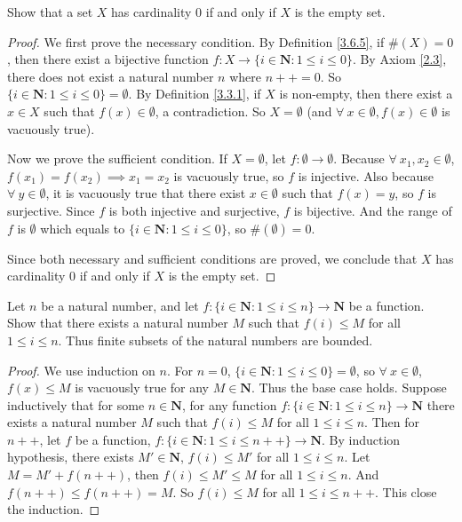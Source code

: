 \begin{exercise}\label{ex 3.6.2}
    Show that a set \(X\) has cardinality \(0\) if and only if \(X\) is the empty set.
\end{exercise}

\begin{proof}
    We first prove the necessary condition.
    By Definition \ref{3.6.5}, if \(\#(X) = 0\), then there exist a bijective function \(f : X \to \{i \in \mathbf{N} : 1 \leq i \leq 0\}\).
    By Axiom \ref{2.3}, there does not exist a natural number \(n\) where \(n++ = 0\).
    So \(\{i \in \mathbf{N} : 1 \leq i \leq 0\} = \emptyset\).
    By Definition \ref{3.3.1}, if \(X\) is non-empty, then there exist a \(x \in X\) such that \(f(x) \in \emptyset\), a contradiction.
    So \(X = \emptyset\) (and \(\forall\ x \in \emptyset, f(x) \in \emptyset\) is vacuously true).

    Now we prove the sufficient condition.
    If \(X = \emptyset\), let \(f : \emptyset \to \emptyset\).
    Because \(\forall\ x_1, x_2 \in \emptyset\), \(f(x_1) = f(x_2) \implies x_1 = x_2\) is vacuously true, so \(f\) is injective.
    Also because \(\forall\ y \in \emptyset\), it is vacuously true that there exist \(x \in \emptyset\) such that \(f(x) = y\), so \(f\) is surjective.
    Since \(f\) is both injective and surjective, \(f\) is bijective.
    And the range of \(f\) is \(\emptyset\) which equals to \(\{i \in \mathbf{N} : 1 \leq i \leq 0\}\), so \(\#(\emptyset) = 0\).

    Since both necessary and sufficient conditions are proved, we conclude that \(X\) has cardinality \(0\) if and only if \(X\) is the empty set.
\end{proof}

\begin{exercise}\label{ex 3.6.3}
    Let \(n\) be a natural number, and let \(f : \{i \in \mathbf{N} : 1 \leq i \leq n\} \to \mathbf{N}\) be a function.
    Show that there exists a natural number \(M\) such that \(f(i) \leq M\) for all \(1 \leq i \leq n\).
    Thus finite subsets of the natural numbers are bounded.
\end{exercise}

\begin{proof}
    We use induction on \(n\).
    For \(n = 0\), \(\{i \in \mathbf{N} : 1 \leq i \leq 0\} = \emptyset\), so \(\forall\ x \in \emptyset\), \(f(x) \leq M\) is vacuously true for any \(M \in \mathbf{N}\).
    Thus the base case holds.
    Suppose inductively that for some \(n \in \mathbf{N}\), for any function \(f : \{i \in \mathbf{N} : 1 \leq i \leq n\} \to \mathbf{N}\) there exists a natural number \(M\) such that \(f(i) \leq M\) for all \(1 \leq i \leq n\).
    Then for \(n++\), let \(f\) be a function, \(f : \{i \in \mathbf{N} : 1 \leq i \leq n++\} \to \mathbf{N}\).
    By induction hypothesis, there exists \(M' \in \mathbf{N}\), \(f(i) \leq M'\) for all \(1 \leq i \leq n\).
    Let \(M = M' + f(n++)\), then \(f(i) \leq M' \leq M\) for all \(1 \leq i \leq n\).
    And \(f(n++) \leq f(n++) = M\).
    So \(f(i) \leq M\) for all \(1 \leq i \leq n++\).
    This close the induction.
\end{proof}

